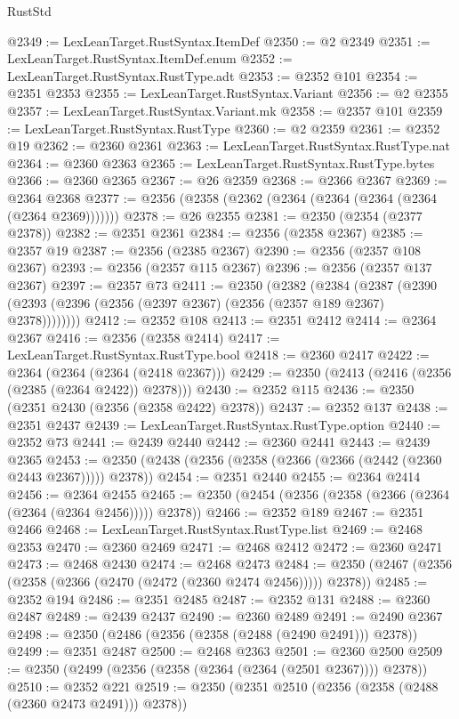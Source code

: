 \begin{lexlean}{RustStd}
\begin{coremodule}
@2349 := LexLeanTarget.RustSyntax.ItemDef
@2350 := @2 @2349
@2351 := LexLeanTarget.RustSyntax.ItemDef.enum
@2352 := LexLeanTarget.RustSyntax.RustType.adt
@2353 := @2352 @101
@2354 := @2351 @2353
@2355 := LexLeanTarget.RustSyntax.Variant
@2356 := @2 @2355
@2357 := LexLeanTarget.RustSyntax.Variant.mk
@2358 := @2357 @101
@2359 := LexLeanTarget.RustSyntax.RustType
@2360 := @2 @2359
@2361 := @2352 @19
@2362 := @2360 @2361
@2363 := LexLeanTarget.RustSyntax.RustType.nat
@2364 := @2360 @2363
@2365 := LexLeanTarget.RustSyntax.RustType.bytes
@2366 := @2360 @2365
@2367 := @26 @2359
@2368 := @2366 @2367
@2369 := @2364 @2368
@2377 := @2356 (@2358 (@2362 (@2364 (@2364 (@2364 (@2364 (@2364 @2369)))))))
@2378 := @26 @2355
@2381 := @2350 (@2354 (@2377 @2378))
@2382 := @2351 @2361
@2384 := @2356 (@2358 @2367)
@2385 := @2357 @19
@2387 := @2356 (@2385 @2367)
@2390 := @2356 (@2357 @108 @2367)
@2393 := @2356 (@2357 @115 @2367)
@2396 := @2356 (@2357 @137 @2367)
@2397 := @2357 @73
@2411 := @2350
    (@2382
      (@2384
        (@2387 (@2390 (@2393 (@2396 (@2356 (@2397 @2367) (@2356 (@2357 @189 @2367) @2378))))))))
@2412 := @2352 @108
@2413 := @2351 @2412
@2414 := @2364 @2367
@2416 := @2356 (@2358 @2414)
@2417 := LexLeanTarget.RustSyntax.RustType.bool
@2418 := @2360 @2417
@2422 := @2364 (@2364 (@2364 (@2418 @2367)))
@2429 := @2350 (@2413 (@2416 (@2356 (@2385 (@2364 @2422)) @2378)))
@2430 := @2352 @115
@2436 := @2350 (@2351 @2430 (@2356 (@2358 @2422) @2378))
@2437 := @2352 @137
@2438 := @2351 @2437
@2439 := LexLeanTarget.RustSyntax.RustType.option
@2440 := @2352 @73
@2441 := @2439 @2440
@2442 := @2360 @2441
@2443 := @2439 @2365
@2453 := @2350 (@2438 (@2356 (@2358 (@2366 (@2366 (@2442 (@2360 @2443 @2367))))) @2378))
@2454 := @2351 @2440
@2455 := @2364 @2414
@2456 := @2364 @2455
@2465 := @2350 (@2454 (@2356 (@2358 (@2366 (@2364 (@2364 (@2364 @2456))))) @2378))
@2466 := @2352 @189
@2467 := @2351 @2466
@2468 := LexLeanTarget.RustSyntax.RustType.list
@2469 := @2468 @2353
@2470 := @2360 @2469
@2471 := @2468 @2412
@2472 := @2360 @2471
@2473 := @2468 @2430
@2474 := @2468 @2473
@2484 := @2350 (@2467 (@2356 (@2358 (@2366 (@2470 (@2472 (@2360 @2474 @2456))))) @2378))
@2485 := @2352 @194
@2486 := @2351 @2485
@2487 := @2352 @131
@2488 := @2360 @2487
@2489 := @2439 @2437
@2490 := @2360 @2489
@2491 := @2490 @2367
@2498 := @2350 (@2486 (@2356 (@2358 (@2488 (@2490 @2491))) @2378))
@2499 := @2351 @2487
@2500 := @2468 @2363
@2501 := @2360 @2500
@2509 := @2350 (@2499 (@2356 (@2358 (@2364 (@2364 (@2501 @2367)))) @2378))
@2510 := @2352 @221
@2519 := @2350 (@2351 @2510 (@2356 (@2358 (@2488 (@2360 @2473 @2491))) @2378))

\end{coremodule}
\end{lexlean}
